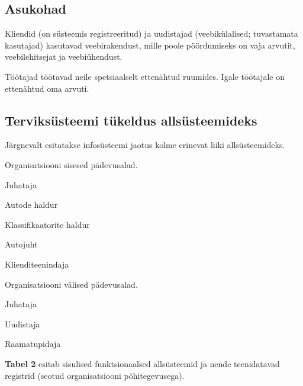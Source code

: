 \subsection{Asukohad}
\begin{myitemize}
	\item Kliendid (on süsteemis registreeritud) ja uudistajad (veebikülalised; tuvastamata kasutajad) kasutavad veebirakendust, mille poole pöördumiseks on vaja arvutit, veebilehitsejat ja veebiühendust.
	\item Töötajad töötavad neile spetsiaalselt ettenähtud ruumides. Igale töötajale on ettenähtud oma arvuti. 
\end{myitemize}

\subsection{Terviksüsteemi tükeldus allsüsteemideks}
Järgnevalt esitatakse infosüsteemi jaotus kolme erinevat liiki allsüsteemideks.
\\
\par
Organisatsiooni sisesed pädevusalad.
\begin{myitemize}
	\item Juhataja
	\item Autode haldur
	\item Klassifikaatorite haldur
	\item Autojuht
	\item Klienditeenindaja
\end{myitemize}

Organisatsiooni välised pädevusalad.
\begin{myitemize}
	\item Juhataja
	\item Uudistaja
	\item Raamatupidaja
\end{myitemize}

\textbf{Tabel 2} esitab sisulised funktsionaalsed allsüsteemid ja nende teenidatavad registrid (seotud organisatsiooni põhitegevusega). %

